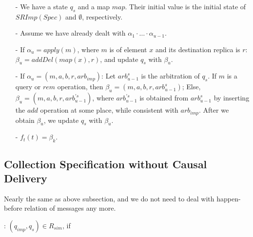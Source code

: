 \begin{itemize}
\setlength{\itemsep}{0.5pt}
\item[-] We have a state $q_s$ and a map $\mathit{map}$. Their initial value is the initial state of $SRImp(Spec)$ and $\emptyset$, respectively.  

\item[-] Assume we have already dealt with $\alpha_1 \cdot \ldots \cdot \alpha_{u-1}$. 

\item[-] If $\alpha_u = apply(m)$, where $m$ is of element $x$ and its destination replica is $r$: $\beta_u = addDel(map(x),r)$, and update $q_s$ with $\beta_u$. 

\item[-] If $\alpha_u = (m,a,b,r,\mathit{arb}_{\mathit{imp}})$: Let $\mathit{arb}_{u-1}^s$ is the arbitration of $q_s$. If $m$ is a query or $\mathit{rem}$ operation, then $\beta_u = (m,a,b,r,\mathit{arb}_{u-1}^s)$; Else, $\beta_u = (m,a,b,r,\mathit{arb}_{u-1}^{'s})$, where $\mathit{arb}_{u-1}^{'s}$ is obtained from $\mathit{arb}_{u-1}^s$ by inserting the $add$ operation at some place, while consistent with $\mathit{arb}_{\mathit{imp}}$. After we obtain $\beta_u$, we update $q_s$ with $\beta_u$.

\item[-] $f_t(t) = \beta_k$. 
\end{itemize}




\subsection{Collection Specification without Causal Delivery}
\label{subsec:collection specification without calusal delivery}

Nearly the same as above subsection, and we do not need to deal with happen-before relation of messages any more. 

:  $(q_{\mathit{imp}},q_s) \in R_{\mathit{sim}}$, if 

